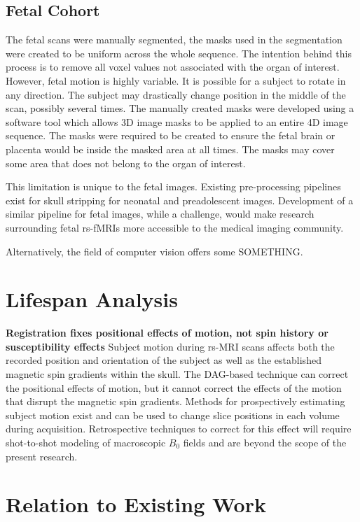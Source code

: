 \subsection{Fetal Cohort}

The fetal scans were manually segmented, the masks used in the segmentation were created to be uniform across the whole sequence. The intention behind this process is to remove all voxel values not associated with the organ of interest. However, fetal motion is highly variable. It is possible for a subject to rotate in any direction. The subject may drastically change position in the middle of the scan, possibly several times. The manually created masks were developed using a software tool which allows 3D image masks to be applied to an entire 4D image sequence. The masks were required to be created to ensure the fetal brain or placenta would be inside the masked area at all times. The masks may cover some area that does not belong to the organ of interest.

This limitation is unique to the fetal images. Existing pre-processing pipelines exist for skull stripping for neonatal and preadolescent images. Development of a similar pipeline for fetal images, while a challenge, would make research surrounding fetal rs-fMRIs more accessible to the medical imaging community.

Alternatively, the field of computer vision offers some SOMETHING.

\section{Lifespan Analysis}

\textbf{Registration fixes positional effects of motion, not spin history or susceptibility effects}
Subject motion during rs-MRI scans affects both the recorded position and orientation of the subject as well as the established magnetic spin gradients within the skull. The DAG-based technique can correct the positional effects of motion, but it cannot correct the effects of the motion that disrupt the magnetic spin gradients. Methods for prospectively estimating subject motion exist and can be used to change slice positions in each volume during acquisition. Retrospective techniques to correct for this effect will require shot-to-shot modeling of macroscopic $B_0$ fields and are beyond the scope of the present research.

\section{Relation to Existing Work}

